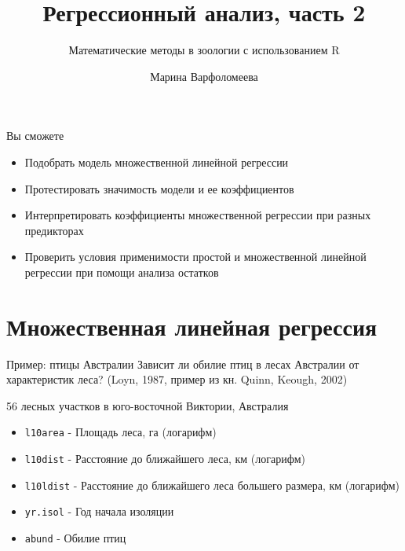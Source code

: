 \documentclass[
  ignorenonframetext,
  t,xcolor=table]{beamer}
\title{Регрессионный анализ, часть 2}
\subtitle{Математические методы в зоологии с использованием R}
\author{Марина Варфоломеева}
\date{}
\providecommand{\tightlist}{%
  \setlength{\itemsep}{0pt}\setlength{\parskip}{0pt}}
\begin{document}
\frame{\titlepage}

\begin{frame}
\begin{block}{Вы сможете}
\protect\hypertarget{ux432ux44b-ux441ux43cux43eux436ux435ux442ux435}{}
\begin{itemize}
\tightlist
\item
  Подобрать модель множественной линейной регрессии
\item
  Протестировать значимость модели и ее коэффициентов
\item
  Интерпретировать коэффициенты множественной регрессии при разных
  предикторах
\item
  Проверить условия применимости простой и множественной линейной
  регрессии при помощи анализа остатков
\end{itemize}
\end{block}
\end{frame}

\hypertarget{ux43cux43dux43eux436ux435ux441ux442ux432ux435ux43dux43dux430ux44f-ux43bux438ux43dux435ux439ux43dux430ux44f-ux440ux435ux433ux440ux435ux441ux441ux438ux44f}{%
\section{Множественная линейная
регрессия}\label{ux43cux43dux43eux436ux435ux441ux442ux432ux435ux43dux43dux430ux44f-ux43bux438ux43dux435ux439ux43dux430ux44f-ux440ux435ux433ux440ux435ux441ux441ux438ux44f}}

\begin{frame}[fragile]{Пример: птицы Австралии}
\protect\hypertarget{ux43fux440ux438ux43cux435ux440-ux43fux442ux438ux446ux44b-ux430ux432ux441ux442ux440ux430ux43bux438ux438}{}
Зависит ли обилие птиц в лесах Австралии от характеристик леса? (Loyn,
1987, пример из кн. Quinn, Keough, 2002)

56 лесных участков в юго-восточной Виктории, Австралия

\begin{itemize}
\tightlist
\item
  \texttt{l10area} - Площадь леса, га (логарифм)
\item
  \texttt{l10dist} - Расстояние до ближайшего леса, км (логарифм)
\item
  \texttt{l10ldist} - Расстояние до ближайшего леса большего размера, км
  (логарифм)
\item
  \texttt{yr.isol} - Год начала изоляции
\item
  \texttt{abund} - Обилие птиц
\end{itemize}
\end{frame}
\end{document}
